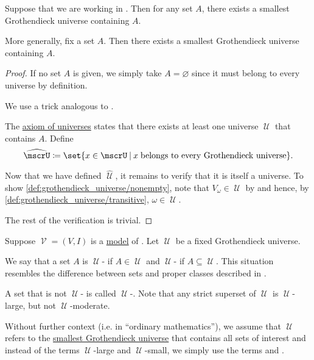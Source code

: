 \begin{proposition}\label{thm:smallest_grothendieck_universe_existence}
  Suppose that we are working in . Then for any set \( A \), there exists a smallest Grothendieck universe containing \( A \).

  More generally, fix a set \( A \). Then there exists a smallest Grothendieck universe containing \( A \).
\end{proposition}
\begin{proof}
  If no set \( A \) is given, we simply take \( A = \varnothing \) since it must belong to every universe by definition.

  We use a trick analogous to .

  The \hyperref[def:axiom_of_universes]{axiom of universes} states that there exists at least one universe \( \mscrU \) that contains \( A \). Define
  \begin{equation*}
    \widehat \mscrU \coloneqq \set{ x \in \mscrU \given x \T{belongs to every Grothendieck universe} }.
  \end{equation*}

  Now that we have defined \( \widehat \mscrU \), it remains to verify that it is itself a universe. To show \ref{def:grothendieck_universe/nonempty}, note that \( V_\omega \in \mscrU \) by  and hence, by \ref{def:grothendieck_universe/transitive}, \( \omega \in \mscrU \).

  The rest of the verification is trivial.
\end{proof}

\begin{definition}\label{def:large_and_small_sets}
  Suppose \( \mscrV = (V, I) \) is a \hyperref[def:first_order_semantics/satisfiability]{model} of . Let \( \mscrU \) be a fixed Grothendieck universe.

  We say that a set \( A \) is \( \mscrU \)- if \( A \in \mscrU \) and \( \mscrU \)- if \( A \subseteq \mscrU \). This situation resembles the difference between sets and proper classes described in .

  A set that is not \( \mscrU \)- is called \( \mscrU \)-. Note that any strict superset of \( \mscrU \) is \( \mscrU \)-large, but not \( \mscrU \)-moderate.

  Without further context (i.e. in \enquote{ordinary mathematics}), we assume that \( \mscrU \) refers to the \hyperref[thm:smallest_grothendieck_universe_existence]{smallest Grothendieck universe} that contains all sets of interest and instead of the terms \( \mscrU \)-large and \( \mscrU \)-small, we simply use the terms  and .
\end{definition}

